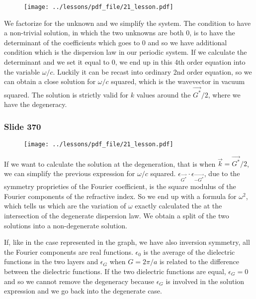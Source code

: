 \documentclass[../main/main.tex]{subfiles}
\begin{document}
\begin{figure}[h!]
\centering
\texttt{[image: ../lessons/pdf\_file/21\_lesson.pdf]}
\end{figure}

We factorize for the unknown and we simplify the system.
The condition to have a non-trivial solution, in which the two unknowns are both 0, is to have the determinant of the coefficients which goes to 0 and so we have additional condition which is the dispersion law in our periodic system.
If we calculate the determinant and we set it equal to 0, we end up in this 4th order equation into the variable $\omega /c$.
Luckily it can be recast into ordinary 2nd order equation, so we can obtain a close solution for $\omega /c$ squared, which is the wavevector in vacuum squared.
The solution is strictly valid for $k$ values around the $\vec{G^*}/2$, where we have the degeneracy.


\newpage

\subsubsection{Slide 370}

\begin{figure}[h!]
\centering
\texttt{[image: ../lessons/pdf\_file/21\_lesson.pdf]}
\end{figure}

If we want to calculate the solution at the degeneration, that is when $\vec{k} = \vec{G^*}/2$, we can simplify the previous expression for $\omega /c$ squared. 
$\epsilon_\vec{G^*} \cdot \epsilon_\vec{-G^*}$, due to the symmetry proprieties of the Fourier coefficient,  is the square modulus of the Fourier components of the refractive index.
So we end up with a formula for $\omega^2$, which tells us which are the variation of $\omega$ exactly calculated the at the intersection of the degenerate dispersion law.
We obtain a split of the two solutions into a non-degenerate solution.

If, like in the case represented in the graph, we have also inversion symmetry, all the Fourier components are real functions.
$\epsilon_0$ is the average of the dielectric functions in the two layers and $\epsilon_G$ when $G = 2 \pi /a $  is related to the difference between the dielectric functions.
If the two dielectric functions are equal, $\epsilon_G = 0$ and so we cannot remove the degeneracy because $\epsilon_G$  is involved in the solution expression and we go back into the degenerate case.
\end{document}
